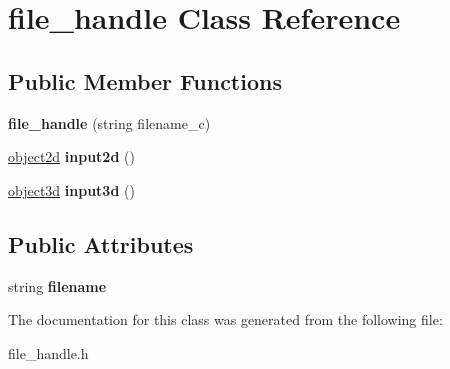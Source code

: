 \hypertarget{classfile__handle}{}\section{file\+\_\+handle Class Reference}
\label{classfile__handle}
\subsection*{Public Member Functions}
\begin{DoxyCompactItemize}
\item 
{\bfseries file\+\_\+handle} (string filename\+\_\+c)\hypertarget{classfile__handle_abe01c00c003b48cba1fec528a76131f4}{}\label{classfile__handle_abe01c00c003b48cba1fec528a76131f4}

\item 
\hyperlink{classobject2d}{object2d} {\bfseries input2d} ()\hypertarget{classfile__handle_a361d811f2c33e4031e0b31b1c79d8907}{}\label{classfile__handle_a361d811f2c33e4031e0b31b1c79d8907}

\item 
\hyperlink{classobject3d}{object3d} {\bfseries input3d} ()\hypertarget{classfile__handle_a237436534186b157c15066e2ad033afe}{}\label{classfile__handle_a237436534186b157c15066e2ad033afe}

\end{DoxyCompactItemize}
\subsection*{Public Attributes}
\begin{DoxyCompactItemize}
\item 
string {\bfseries filename}\hypertarget{classfile__handle_afe548bf4e2b6ac870b9dce7b979ca378}{}\label{classfile__handle_afe548bf4e2b6ac870b9dce7b979ca378}

\end{DoxyCompactItemize}


The documentation for this class was generated from the following file\+:\begin{DoxyCompactItemize}
\item 
file\+\_\+handle.\+h\end{DoxyCompactItemize}
